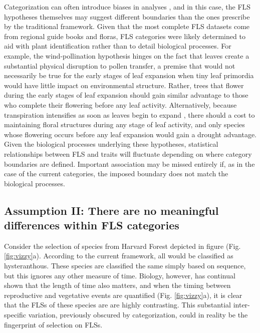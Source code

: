 \documentclass{article}
\begin{document}
{\noindent Categorization can often introduce biases in analyses \citep{Naggara2011,Royston2006}, and in this case, the FLS hypotheses themselves may suggest different boundaries than the ones prescribe by the traditional framework. Given that the most complete FLS datasets come from regional guide books and floras, FLS categories were likely determined to aid with plant identification rather than to detail biological processes. For example, the wind-pollination hypothesis hinges on the fact that leaves create a substantial physical disruption to pollen transfer, a premise that would not necessarily be true for the early stages of leaf expansion when tiny leaf primordia would have little impact on environmental structure. Rather, trees that flower during the early stages of leaf expansion should gain similar advantage to those who complete their flowering before any leaf activity. Alternatively, because transpiration intensifies as soon as leaves begin to expand \citep{Breda1996,Wang2018}, there should a cost to maintaining floral structures during any stage of leaf activity, and only species whose flowering occurs before any leaf expansion would gain a drought advantage. Given the biological processes underlying these hypotheses, statistical relationships between FLS and traits will fluctuate depending on where category boundaries are defined. Important association may be missed entirely if, as in the case of the current categories, the imposed boundary does not match the biological processes.

\subsection*{Assumption II: There are no meaningful differences within FLS categories}
 Consider the selection of species from Harvard Forest depicted in figure (Fig. \ref{fig:vizzy}a). According to the current framework, all would be classified as hysteranthous. These species are classified the same simply based on sequence, but this ignores any other measure of time. Biology, however, has continual shown that the length of time also matters\citep{Inouye2019}, and when the timing between reproductive and vegetative events are quantified (Fig. \ref{fig:vizzy}a), it is clear that the FLSs of these species are are highly contrasting. This substantial inter-specific variation, previously obscured by categorization, could in reality be the fingerprint of selection on FLSs. %

}
\end{document}
